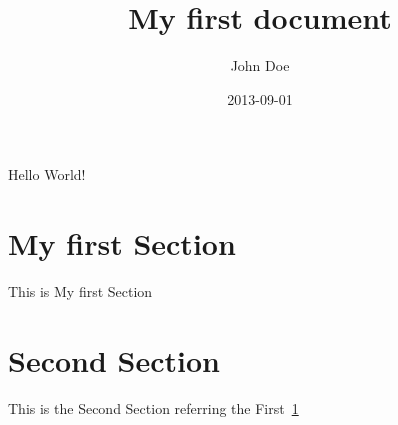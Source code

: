 \documentclass{article}
\title{My first document}
\date{2013-09-01}
\author{John Doe}
\begin{document}
  \maketitle
  \newpage


  Hello World!


  \section{My first Section}
  \label{sec:mfs}


  This is My first Section



  \section{Second Section}
  \label{sec:ss}


  This is the Second Section referring the First~\ref{sec:mfs}
\end{document}
